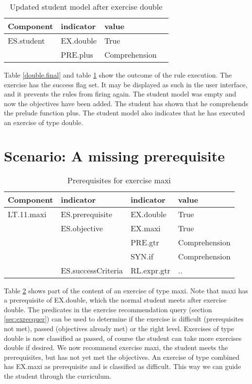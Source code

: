 \begin{table}[H]
\begin{tabular}{| l | l | l | l}
\hline
Component & indicator & value\\
\hline
ES.student & EX.double & True \\
& PRE.plus & Comprehension  \\
\hline
\end{tabular}

\caption{Updated student model after exercise double}
\label{double.student}
\end{table}

Table \ref{double.final} and table \ref{double.student} show the outcome of the rule execution.
The exercise has the success flag set. 
It may be displayed as such in the user interface, and it prevents the rules from firing again.
The student model was empty and now the objectives have been added.
The student has shown that he comprehends the prelude function plus.
The student model also indicates that he has executed an exercise of type double.

\section{Scenario: A missing prerequisite}
 \label{sec:preqsts}
\begin{table}[H]
\begin{tabular}{| l | l | l | l |}
\hline
Component & indicator & indicator & value\\
\hline
LT.11.maxi & ES.prerequisite &EX.double & True\\
&ES.objective & EX.maxi & True\\
& & PRE.gtr &  Comprehension\\
& & SYN.if & Comprehension\\
& ES.successCriteria & RL.expr.gtr & ..\\
\hline
\end{tabular}
\caption{Prerequisites for exercise maxi}
\label{maxi.preq}
\end{table}

Table \ref{maxi.preq} shows  part of the content of an exercise of type maxi.
Note that maxi has a prerequisite of EX.double, which the normal student meets after exercise double.
The predicates in the exercise recommendation query (section \ref{sec:exrecquer}) can be used to determine if the
exercise is difficult (prerequisites not met),  passed (objectives already met) or the right level.
Exercises of type double is now classified as passed, of course the student can take more exercises double if desired.
We now recommend exercise maxi, the student meets the prerequisites, but has not yet met the objectives.
An exercise of type combined has EX.maxi  as prerequisite and is classified as difficult.
This way we can guide the student through the curriculum.

